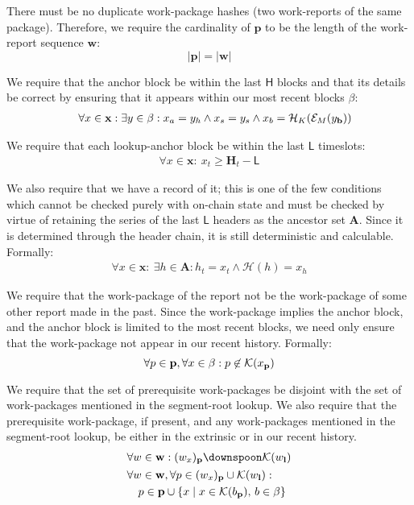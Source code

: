 There must be no duplicate work-package hashes (\ie two work-reports of the same package). Therefore, we require the cardinality of $\mathbf{p}$ to be the length of the work-report sequence $\mathbf{w}$:
\begin{equation}
  |\mathbf{p}| = |\mathbf{w}|
\end{equation}

We require that the anchor block be within the last $\mathsf{H}$ blocks and that its details be correct by ensuring that it appears within our most recent blocks $\beta$:
\begin{align}
  \forall x \in \mathbf{x} : \exists y \in \beta : x_a = y_h \wedge x_s = y_s \wedge x_b = \mathcal{H}_K(\mathcal{E}_M(y_\mathbf{b}))\!\!\!\!\!\!
\end{align}

We require that each lookup-anchor block be within the last $\mathsf{L}$ timeslots:
\begin{align}
  \forall x \in \mathbf{x} :\ x_t \ge \mathbf{H}_t - \mathsf{L}
\end{align}

We also require that we have a record of it; this is one of the few conditions which cannot be checked purely with on-chain state and must be checked by virtue of retaining the series of the last $\mathsf{L}$ headers as the ancestor set $\mathbf{A}$. Since it is determined through the header chain, it is still deterministic and calculable. Formally:
\begin{align}
  \forall x \in \mathbf{x} :\ \exists h \in \mathbf{A}: h_t = x_t \wedge \mathcal{H}(h) = x_h
\end{align}

We require that the work-package of the report not be the work-package of some other report made in the past. Since the work-package implies the anchor block, and the anchor block is limited to the most recent blocks, we need only ensure that the work-package not appear in our recent history. Formally:
\begin{equation}
  \forall p \in \mathbf{p}, \forall x \in \beta : p \not\in \mathcal{K}(x_\mathbf{p})
\end{equation}

We require that the set of prerequisite work-packages be disjoint with the set of work-packages mentioned in the segment-root lookup. We also require that the prerequisite work-package, if present, and any work-packages mentioned in the segment-root lookup, be either in the extrinsic or in our recent history.
\begin{align}
  &\forall w \in \mathbf{w} : (w_x)_\mathbf{p} \disjoint \keys{w_\mathbf{l}}\\
  &\begin{aligned}
    &\forall w \in \mathbf{w}, \forall p \in (w_x)_\mathbf{p} \cup \keys{w_\mathbf{l}} :\\
    &\quad p \in \mathbf{p} \cup \{ x \mid x \in \keys{b_\mathbf{p}} ,\, b \in \beta \}
  \end{aligned}
\end{align}


